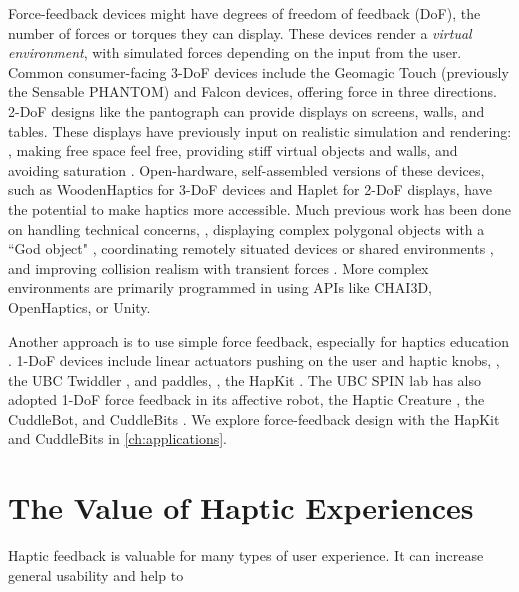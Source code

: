 Force-feedback devices might have degrees of freedom of feedback (DoF), the number of forces or torques they can display.
These devices render a \emph{virtual environment}, with simulated forces depending on the input from the user.
Common consumer-facing 3-DoF devices include the Geomagic Touch (previously the Sensable PHANTOM) and Falcon devices, offering force in three directions.
2-DoF designs like the pantograph \cite{Ramstein1994,Campion2005} can provide displays on screens, walls, and tables.
These displays have previously input on realistic simulation and rendering: \eg, making free space feel free, providing stiff virtual objects and walls, and avoiding saturation  \cite{massie1994phantom}.
Open-hardware, self-assembled versions of these devices, such as WoodenHaptics \cite{Forsslund2015} for 3-DoF devices and Haplet \cite{Gallacher2016} for 2-DoF displays, have the potential to make haptics more accessible.
Much previous work has been done on handling technical concerns, \eg, displaying complex polygonal objects with a ``God object" \cite{Zilles1995}, coordinating remotely situated devices or shared environments \cite{Buttolo1997}, and improving collision realism with transient forces \cite{Kuchenbecker2006}.
More complex environments are primarily programmed in using APIs like CHAI3D, OpenHaptics, or Unity.

Another approach is to use simple force feedback, especially for haptics education \cite{Jones2014}.
1-DoF devices include linear actuators pushing on the user and haptic knobs, \eg, the UBC Twiddler \cite{Shaver2003,Enriquez2003,MacLean2009a}, and paddles, \eg, the HapKit \cite{Martinez2016}.
The UBC SPIN lab has also adopted 1-DoF force feedback in its affective robot, the Haptic Creature \cite{Yohanan2011,Yohanan2011}, the CuddleBot, and CuddleBits \cite{cang2015cuddlebits}.
We explore force-feedback design with the HapKit and CuddleBits in \autoref{ch:applications}.


%

%
%
\section{The Value of Haptic Experiences}
Haptic feedback is valuable for many types of user experience.
It can increase general usability and help to



